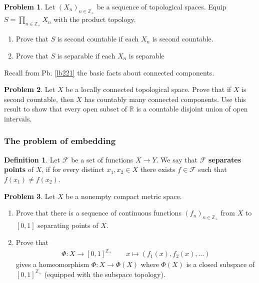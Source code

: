 \documentclass[12pt,b5paper,notitlepage]{article}
\theoremstyle{definition}
\newtheorem{df}{Definition}[section]
\newtheorem{prob}{\color{red}Problem}[section]
\theoremstyle{plain}
\newcommand{\scr}{\mathscr}
\newcommand{\Zbb}{\mathbb Z}
\newcommand{\Rbb}{\mathbb R}
\numberwithin{equation}{section}
\begin{document}
\begin{prob}\label{lb305}
Let $(X_n)_{n\in\Zbb_+}$ be a sequence of topological spaces. Equip $S=\prod_{n\in\Zbb_+}X_n$ with the product topology. 
\begin{enumerate}
\item Prove that $S$ is second countable if each $X_n$ is second countable.
\item Prove that $S$ is separable if each $X_n$ is separable
\end{enumerate}
\end{prob}


Recall from Pb. \ref{lb221} the basic facts about connected components.

\begin{prob}
Let $X$ be a locally connected topological space. Prove that if $X$ is second countable, then $X$ has countably many connected components. Use this result to show that every open subset of $\Rbb$ is a countable disjoint union of open intervals.
\end{prob}



\subsubsection{The problem of embedding}


\begin{df}\label{lb327}
Let $\scr F$ be a set of functions $X\rightarrow Y$. We say that $\scr F$ \textbf{separates points}  of $X$, if for every distinct $x_1,x_2\in X$ there exists $f\in\scr F$ such that $f(x_1)\neq f(x_2)$. 
\end{df}

\begin{prob}\label{lb259}
Let $X$ be a nonempty compact metric space.
\begin{enumerate}
\item Prove that there is a sequence of continuous functions $(f_n)_{n\in\Zbb_+}$ from $X$ to $[0,1]$ separating points of $X$. 
\item Prove that 
\begin{gather*}
\Phi:X\rightarrow [0,1]^{\Zbb_+} \qquad x\mapsto (f_1(x),f_2(x),\dots)
\end{gather*}
gives a homeomorphism $\Phi:X\rightarrow\Phi(X)$ where $\Phi(X)$ is a closed subspace of $[0,1]^{\Zbb_+}$ (equipped with the subspace topology).
\end{enumerate}
\end{prob}
\end{document}

